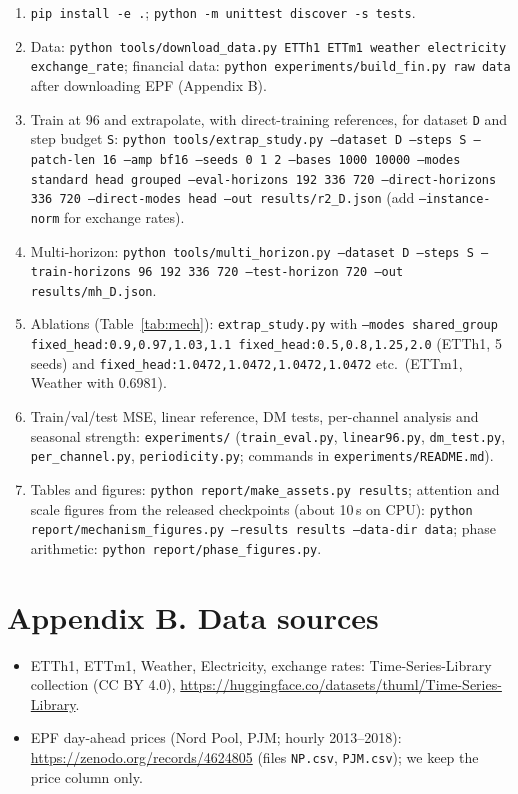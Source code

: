 \documentclass[12pt]{article}
\begin{document}
{\raggedright
\begin{enumerate}
\item \texttt{pip install -e .}; \texttt{python -m unittest discover -s tests}.
\item Data: \texttt{python tools/download\_data.py ETTh1 ETTm1 weather electricity exchange\_rate}; financial data: \texttt{python experiments/build\_fin.py raw data} after downloading EPF (Appendix B).
\item Train at 96 and extrapolate, with direct-training references, for dataset \texttt{D} and step budget \texttt{S}: \texttt{python tools/extrap\_study.py --dataset D --steps S --patch-len 16 --amp bf16 --seeds 0 1 2 --bases 1000 10000 --modes standard head grouped --eval-horizons 192 336 720 --direct-horizons 336 720 --direct-modes head --out results/r2\_D.json} (add \texttt{--instance-norm} for exchange rates).
\item Multi-horizon: \texttt{python tools/multi\_horizon.py --dataset D --steps S --train-horizons 96 192 336 720 --test-horizon 720 --out results/mh\_D.json}.
\item Ablations (Table~\ref{tab:mech}): \texttt{extrap\_study.py} with \texttt{--modes shared\_group fixed\_head:0.9,0.97,1.03,1.1 fixed\_head:0.5,0.8,1.25,2.0} (ETTh1, 5 seeds) and \texttt{fixed\_head:1.0472,1.0472,1.0472,1.0472} etc.\ (ETTm1, Weather with 0.6981).
\item Train/val/test MSE, linear reference, DM tests, per-channel analysis and seasonal strength: \texttt{experiments/} (\texttt{train\_eval.py}, \texttt{linear96.py}, \texttt{dm\_test.py}, \texttt{per\_channel.py}, \texttt{periodicity.py}; commands in \texttt{experiments/README.md}).
\item Tables and figures: \texttt{python report/make\_assets.py results}; attention and scale figures from the released checkpoints (about 10\,s on CPU): \texttt{python report/mechanism\_figures.py --results results --data-dir data}; phase arithmetic: \texttt{python report/phase\_figures.py}.
\end{enumerate}}

\section*{Appendix B. Data sources}
\begin{itemize}
\item ETTh1, ETTm1, Weather, Electricity, exchange rates: Time-Series-Library collection (CC BY 4.0), \url{https://huggingface.co/datasets/thuml/Time-Series-Library}.
\item EPF day-ahead prices (Nord Pool, PJM; hourly 2013--2018): \url{https://zenodo.org/records/4624805} (files \texttt{NP.csv}, \texttt{PJM.csv}); we keep the price column only.
\end{itemize}
\end{document}
